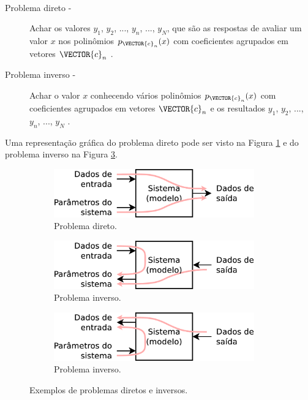 \begin{example}~
\begin{description}
\item[Problema direto -] Achar os valores $y_1$, $y_2$, ..., $y_n$, ..., $y_N$, 
que são as respostas de avaliar um valor $x$ nos polinômios 
$p_{\VECTOR{c}_n}(x)$ com coeficientes agrupados em vetores $\VECTOR{c}_n$ \cite{Keller76}.
\item[Problema inverso -] Achar o valor $x$
conhecendo vários polinômios $p_{\VECTOR{c}_n}(x)$ com coeficientes agrupados em vetores $\VECTOR{c}_n$ e
os resultados $y_1$, $y_2$, ..., $y_n$, ..., $y_N$  \cite{Keller76}.
\end{description}
Uma representação gráfica do problema direto pode ser visto na Figura \ref{fig:inverso-diretos:direto1}
e do problema inverso na Figura \ref{fig:inverso-diretos:inverso2}.
\end{example}

\begin{figure}[!h]
     \centering
     \begin{subfigure}[b]{0.49\textwidth}
         \centering
         \includegraphics[width=0.95\textwidth]{chapters/notacao/direto1.eps}
         \caption{Problema direto.}
         \label{fig:inverso-diretos:direto1}
     \end{subfigure}
     \hfill
     \begin{subfigure}[b]{0.49\textwidth}
         \centering
         \includegraphics[width=0.95\textwidth]{chapters/notacao/inverso1.eps}
         \caption{Problema inverso.}
         \label{fig:inverso-diretos:inverso1}
     \end{subfigure}
     \hfill
     \begin{subfigure}[b]{0.49\textwidth}
         \centering
         \includegraphics[width=0.95\textwidth]{chapters/notacao/inverso2.eps}
         \caption{Problema inverso.}
         \label{fig:inverso-diretos:inverso2}
     \end{subfigure}
        \caption{Exemplos de problemas diretos e inversos.}
        \label{fig:inverso-diretos}
\end{figure}

